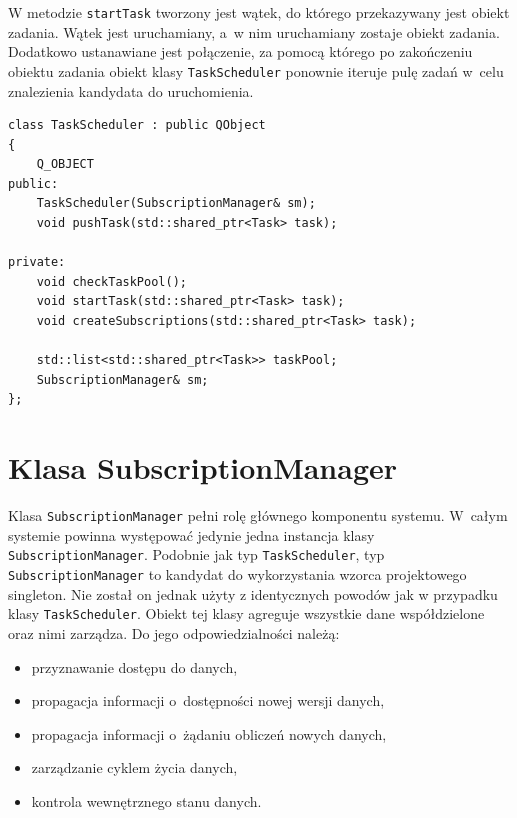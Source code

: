 W metodzie \lstinline$startTask$ tworzony jest wątek, do którego przekazywany jest obiekt zadania. Wątek jest uruchamiany, a~w nim uruchamiany zostaje obiekt zadania. Dodatkowo ustanawiane jest połączenie, za pomocą którego po zakończeniu obiektu zadania obiekt klasy \lstinline$TaskScheduler$ ponownie iteruje pulę zadań w~celu znalezienia kandydata do uruchomienia. 

\begin{minipage}{\textwidth}
	\begin{lstlisting}[label=scheduler:interface, caption={Deklaracja klasy \lstinline$TaskScheduler$.},alsoletter={()[].=}]
class TaskScheduler : public QObject
{
	Q_OBJECT
public:
	TaskScheduler(SubscriptionManager& sm);
	void pushTask(std::shared_ptr<Task> task);

private:
	void checkTaskPool();
	void startTask(std::shared_ptr<Task> task);
	void createSubscriptions(std::shared_ptr<Task> task);

	std::list<std::shared_ptr<Task>> taskPool;
	SubscriptionManager& sm;
};
	\end{lstlisting}
\end{minipage}

\section{Klasa SubscriptionManager}
Klasa \lstinline$SubscriptionManager$ pełni rolę głównego komponentu systemu. W~całym systemie powinna występować jedynie jedna instancja klasy \lstinline$SubscriptionManager$. Podobnie jak typ \lstinline$TaskScheduler$, typ \lstinline$SubscriptionManager$ to kandydat do wykorzystania wzorca projektowego singleton. Nie został on jednak użyty z identycznych powodów jak w przypadku klasy \lstinline$TaskScheduler$. Obiekt tej klasy agreguje wszystkie dane współdzielone oraz nimi zarządza. Do jego odpowiedzialności należą:
\begin{itemize}
	\item przyznawanie dostępu do danych,
	\item propagacja informacji o~dostępności nowej wersji danych,
	\item propagacja informacji o~żądaniu obliczeń nowych danych,
	\item zarządzanie cyklem życia danych,
	\item kontrola wewnętrznego stanu danych.
\end{itemize}

